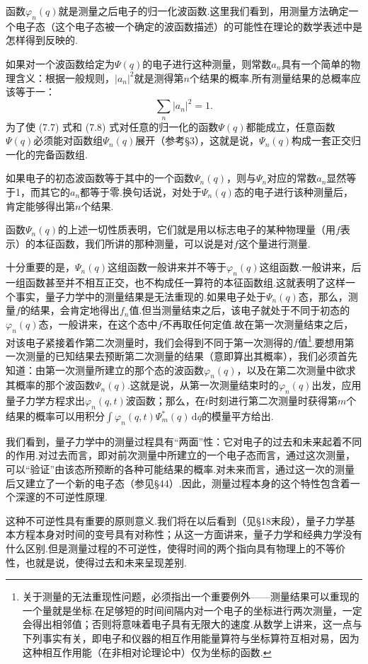 函数$\varphi_n(q)$就是测量之后电子的归一化波函数.这里我们看到，用测量方法确定一个电子态（这个电子态被一个确定的波函数描述）的可能性在理论的数学表述中是怎样得到反映的.

如果对一个波函数给定为$\varPsi(q)$的电子进行这种测量，则常数$a_n$具有一个简单的物理含义：根据一般规则，$|a_n|^2$就是测得第$n$个结果的概率.所有测量结果的总概率应该等于一：
\begin{equation}
  \sum_n|a_n|^2=1.
\end{equation}
为了使 (7.7) 式和 (7.8) 式对任意的归一化的函数$\varPsi(q)$都能成立，任意函数$\varPsi(q)$必须能对函数组$\varPsi_n(q)$展开（参考§3），这就是说，$\varPsi_n(q)$构成一套正交归一化的完备函数组.

如果电子的初态波函数等于其中的一个函数$\varPsi_n(q)$，则与$\varPsi_n$对应的常数$a_n$显然等于1，而其它的$a_n$都等于零.换句话说，对处于$\varPsi_n(q)$态的电子进行该种测量后，肯定能够得出第$n$个结果.

函数$\varPsi_n(q)$的上述一切性质表明，它们就是用以标志电子的某种物理量（用$f$表示）的本征函数，我们所讲的那种测量，可以说是对$f$这个量进行测量.

十分重要的是，$\varPsi_n(q)$这组函数一般讲来并不等于$\varphi_n(q)$这组函数.一般讲来，后一组函数甚至并不相互正交，也不构成任一算符的本征函数组.这就表明了这样一个事实，量子力学中的测量结果是无法重现的.如果电子处于$\varPsi_n(q)$态，那么，测量$f$的结果，会肯定地得出$f_n$值.但当测量结束之后，该电子就处于不同于初态的$\varphi_n(q)$态，一般讲来，在这个态中$f$不再取任何定值.故在第一次测量结束之后，对该电子紧接着作第二次测量时，我们会得到不同于第一次测得的$f$值\footnote{关于测量的无法重现性问题，必须指出一个重要例外——测量结果可以重现的一个量就是坐标.在足够短的时间间隔内对一个电子的坐标进行两次测量，一定会得出相邻值；否则将意味着电子具有无限大的速度.从数学上讲来，这一点与下列事实有关，即电子和仪器的相互作用能量算符与坐标算符互相对易，因为这种相互作用能（在非相对论理论中）仅为坐标的函数.}.要想用第一次测量的已知结果去预断第二次测量的结果（意即算出其概率），我们必须首先知道：由第一次测量所建立的那个态的波函数$\varphi_n(q)$，以及在第二次测量中欲求其概率的那个波函数$\varPsi_n(q)$.这就是说，从第一次测量结束时的$\varphi_n(q)$出发，应用量子力学方程求出$\varphi_n(q,t)$波函数；那么，在$t$时刻进行第二次测量时获得第$m$个结果的概率可以用积分$\int\varphi_n(q,t)\varPsi_m^{*}(q)\,\mathrm{d}q$的模量平方给出.

我们看到，量子力学中的测量过程具有“两面”性：它对电子的过去和未来起着不同的作用.对过去而言，即对前次测量中所建立的一个电子态而言，通过这次测量，可以“验证”由该态所预断的各种可能结果的概率.对未来而言，通过这一次的测量后又建立了一个新的电子态（参见§44\mbox{）.}因此，测量过程本身的这个特性包含着一个深邃的不可逆性原理.

这种不可逆性具有重要的原则意义.我们将在以后看到（见§18末段），量子力学基本方程本身对时间的变号具有对称性；从这一方面讲来，量子力学和经典力学没有什么区别.但是测量过程的不可逆性，使得时间的两个指向具有物理上的不等价性，也就是说，使得过去和未来呈现差别.
